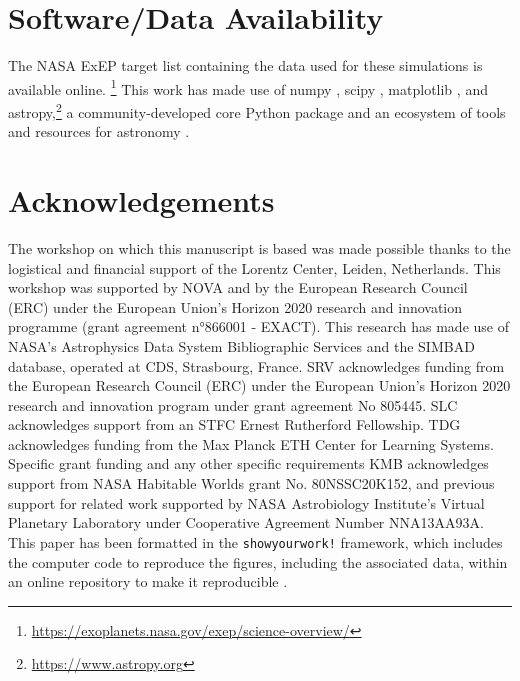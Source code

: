 \documentclass[
    usenatbib,
]{mnras}
\begin{document}
\section*{Software/Data Availability}

The NASA ExEP target list containing the data used for these simulations is available online.
%
\footnote{\url{https://exoplanets.nasa.gov/exep/science-overview/}}
This work has made use of \textsf{numpy}
 \citep{NumPy2020}, \textsf{scipy} \citep{scipy_2020}, \textsf{matplotlib} \citep{matplotlib2007}, and \textsf{astropy},\footnote{\url{https://www.astropy.org}} a community-developed core Python package and an ecosystem of tools and resources for astronomy \citep{astropy:2013, astropy:2018, astropy:2022}.

\section*{Acknowledgements}

The workshop on which this manuscript is based was made possible thanks to the logistical and financial support of the Lorentz Center, Leiden, Netherlands.
%
This workshop was supported by NOVA  and by the European Research Council (ERC) under the European Union's Horizon 2020 research and innovation programme (grant agreement n°866001 - EXACT).
%
This research has made use of NASA's Astrophysics Data System Bibliographic Services and the SIMBAD database, operated at CDS, Strasbourg, France. 
%
SRV acknowledges funding from the European Research Council (ERC) under the European Union’s Horizon 2020 research and innovation program under grant agreement No 805445.
%
SLC acknowledges support from an STFC Ernest Rutherford Fellowship. 
%
TDG acknowledges funding from the Max Planck ETH Center for Learning Systems.
%
Specific grant funding and any other specific requirements
%
KMB acknowledges support from NASA Habitable
%
Worlds grant No. 80NSSC20K152, and previous support for related work supported by NASA Astrobiology Institute's Virtual Planetary Laboratory under Cooperative Agreement Number NNA13AA93A.
%
This paper has been formatted in the {\tt showyourwork!} framework, which includes the computer code to reproduce the figures, including the associated data, within an online repository to make it reproducible \citep{Luger2021}.



\end{document}
